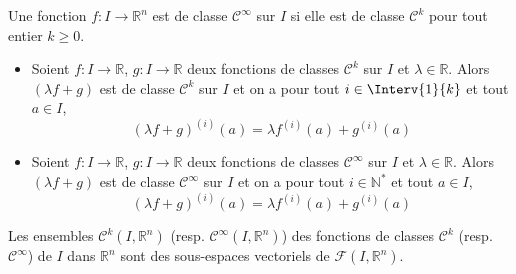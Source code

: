 \documentclass[a4paper,10pt]{report}
\begin{document}
\begin{Definition}{} Une fonction $f : I \rightarrow \mathbb{R}^n$ est de classe $\mathcal{C}^{\infty}$ sur $I$ si elle est de classe $\mathcal{C}^k$ pour tout entier $k \geq 0$.
\end{Definition}
%



\begin{Proposition}{} 
\begin{itemize}
\item Soient $f : I \rightarrow \mathbb{R}$, $g : I \rightarrow \mathbb{R}$ deux fonctions de classes $\mathcal{C}^k$ sur $I$ et $\lambda \in \mathbb{R}$. Alors $(\lambda f+g)$ est de classe $\mathcal{C}^k$ sur $I$ et on a pour tout $i \in  \Interv{1}{k}$ et tout $a \in I$,
$$ (\lambda f+g)^{(i)}(a) = \lambda f^{(i)}(a) + g^{(i)}(a) $$
\item  Soient $f : I \rightarrow \mathbb{R}$, $g : I \rightarrow \mathbb{R}$ deux fonctions de classes $\mathcal{C}^{\infty}$ sur $I$ et $\lambda \in \mathbb{R}$. Alors $(\lambda f+g)$ est de classe $\mathcal{C}^{\infty}$ sur $I$ et on a pour tout $i \in \mathbb{N}^*$ et tout $a \in I$,
$$ (\lambda f+g)^{(i)}(a) = \lambda f^{(i)}(a) + g^{(i)}(a) $$
\end{itemize}
\end{Proposition}

\begin{Remarque}{} Les ensembles $\mathcal{C}^k(I, \mathbb{R}^n)$ (resp. $\mathcal{C}^{\infty}(I, \mathbb{R}^n)$) des fonctions de classes $\mathcal{C}^k$ (resp. $\mathcal{C}^{\infty}$) de $I$ dans $\mathbb{R}^n$ sont des sous-espaces vectoriels de $\mathcal{F}(I, \mathbb{R}^n)$.
\end{Remarque}
\end{document}
